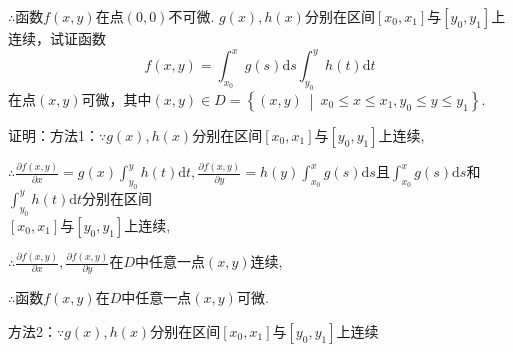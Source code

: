 \documentclass[12pt,UTF8]{ctexart}
\newcommand\Set[2]{\left\{#1\ \middle\vert\ #2 \right\}}
\begin{document}
\begin{enumerate}
$\therefore$函数$f(x,y)$在点$(0,0)$不可微.
$g(x),h(x)$分别在区间$[x_0,x_1]$与$[y_0,y_1]$上连续，试证函数
\[f(x,y)=\int_{x_0}^xg(s)\mathrm ds\int_{y_0}^yh(t)\mathrm dt\]
在点$(x,y)$可微，其中$(x,y)\in D=\Set{(x,y)}{x_0\leq x\leq x_1,y_0\leq y\leq y_1}$.

证明：方法1：$\because g(x),h(x)$分别在区间$[x_0,x_1]$与$[y_0,y_1]$上连续,

$\therefore\frac{\partial f(x,y)}{\partial x}=g(x)\int_{y_0}^yh(t)\mathrm dt,\frac{\partial f(x,y)}{\partial y}=h(y)\int_{x_0}^xg(s)\mathrm ds$且$\int_{x_0}^xg(s)\mathrm ds$和$\int_{y_0}^yh(t)\mathrm dt$分别在区间\\
$[x_0,x_1]$与$[y_0,y_1]$上连续,

$\therefore\frac{\partial f(x,y)}{\partial x},\frac{\partial f(x,y)}{\partial y}$在$D$中任意一点$(x,y)$连续,

$\therefore$函数$f(x,y)$在$D$中任意一点$(x,y)$可微.

方法2：$\because g(x),h(x)$分别在区间$[x_0,x_1]$与$[y_0,y_1]$上连续


\end{enumerate}
\end{document}
